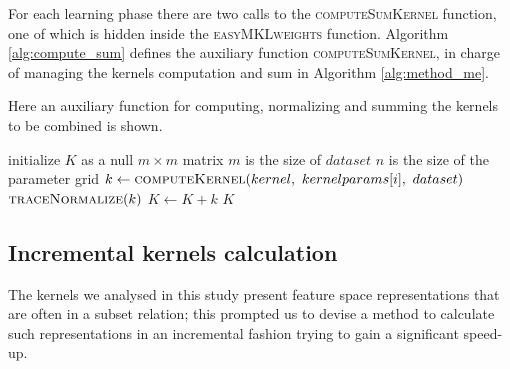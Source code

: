 For each learning phase there are two calls to the \textsc{computeSumKernel}
function, one of which is hidden inside the \textsc{easyMKLweights} function.
Algorithm \ref{alg:compute_sum} defines the auxiliary function \textsc{computeSumKernel},
in charge of managing the kernels computation and sum in Algorithm \ref{alg:method_me}.

\begin{algorithm}
    \caption{
        Here an auxiliary function for computing, normalizing and summing the
        kernels to be combined is shown.
    }
    \label{alg:compute_sum}
    \begin{algorithmic}[1]
            \State initialize $K$ as a null $m\times m$ matrix
            \Comment $m$ is the size of $dataset$
            \Comment $n$ is the size of the parameter grid
            \State $k \gets \Call{computeKernel}{kernel,~kernelparams[i],~dataset}$
                    \State $\Call{traceNormalize}{k}$
                    \State $K \gets K+k$
                \EndFor
            \EndFor
            \State \Return $K$
        \EndFunction
    \end{algorithmic}
\end{algorithm}

\subsection{Incremental kernels calculation} 
\label{subsec:inc}
The kernels we analysed in this study present feature space representations
that are often in a subset relation; this prompted us to devise a method to
calculate such representations in an incremental fashion trying to gain a
significant speed-up.

